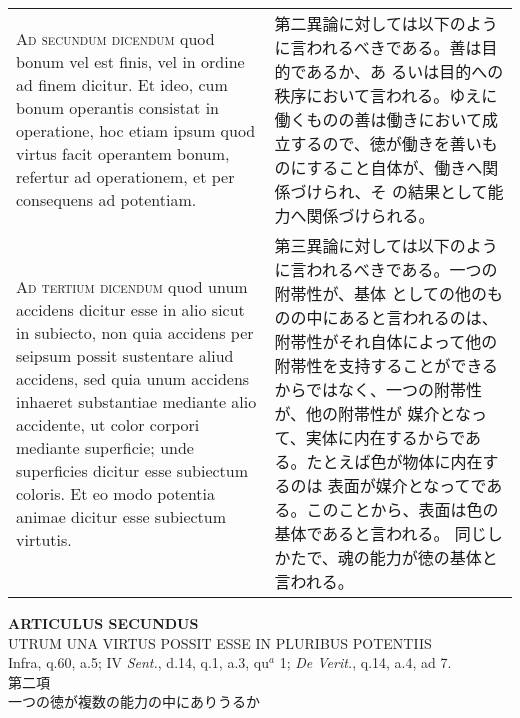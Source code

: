 \documentclass[10pt]{jsarticle}
\begin{document}
\begin{longtable}{p{21em}p{21em}}
\\



{\scshape Ad secundum dicendum} quod bonum vel est finis, vel in
ordine ad finem dicitur. Et ideo, cum bonum operantis consistat in
operatione, hoc etiam ipsum quod virtus facit operantem bonum,
refertur ad operationem, et per consequens ad potentiam.

&

第二異論に対しては以下のように言われるべきである。善は目的であるか、あ
るいは目的への秩序において言われる。ゆえに働くものの善は働きにおいて成
立するので、徳が働きを善いものにすること自体が、働きへ関係づけられ、そ
の結果として能力へ関係づけられる。

\\

{\scshape Ad tertium dicendum} quod unum accidens dicitur esse in alio
sicut in subiecto, non quia accidens per seipsum possit sustentare
aliud accidens, sed quia unum accidens inhaeret substantiae mediante
alio accidente, ut color corpori mediante superficie; unde superficies
dicitur esse subiectum coloris. Et eo modo potentia animae dicitur
esse subiectum virtutis.

&

第三異論に対しては以下のように言われるべきである。一つの附帯性が、基体
としての他のものの中にあると言われるのは、附帯性がそれ自体によって他の
附帯性を支持することができるからではなく、一つの附帯性が、他の附帯性が
媒介となって、実体に内在するからである。たとえば色が物体に内在するのは
表面が媒介となってである。このことから、表面は色の基体であると言われる。
同じしかたで、魂の能力が徳の基体と言われる。


\end{longtable}
\newpage

\begin{center}
{\Large {\bf ARTICULUS SECUNDUS}}\\
{\large UTRUM UNA VIRTUS POSSIT ESSE IN PLURIBUS POTENTIIS}\\
{\footnotesize Infra, q.60, a.5; IV {\itshape Sent.}, d.14, q.1, a.3, qu$^{a}$ 1; {\itshape De Verit.}, q.14, a.4, ad 7.}\\
{\Large 第二項\\一つの徳が複数の能力の中にありうるか}
\end{center}
\end{document}
